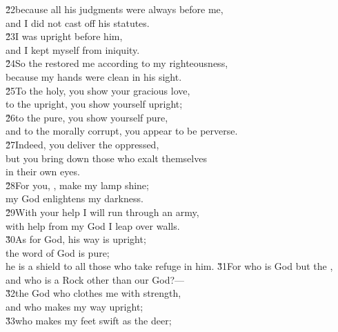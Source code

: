 \begin{poetry}
\poeml \v{22}because all his judgments were always before me, \\
\poemll    and I did not cast off his statutes. \\
\poeml \v{23}I was upright before him, \\
\poemll    and I kept myself from iniquity. \\
\poeml \v{24}So the  restored me according to my righteousness, \\
\poemll    because my hands were clean in his sight. \\
\poeml \v{25}To the holy, you show your gracious love, \\
\poemll    to the upright, you show yourself upright; \\
\poeml \v{26}to the pure, you show yourself pure, \\
\poemll    and to the morally corrupt, you appear to be perverse. \\
\poeml \v{27}Indeed, you deliver the oppressed, \\
\poemll    but you bring down those who exalt themselves \\
\poemlll       in their own eyes. \\
\poeml \v{28}For you, , make my lamp shine; \\
\poemll    my God enlightens my darkness. \\
\poeml \v{29}With your help I will run through an army, \\
\poemll    with help from my God I leap over walls. \\
\poeml \v{30}As for God, his way is upright; \\
\poemll    the word of God is pure; \\
\poemlll       he is a shield to all those who take refuge in him.
\poeml \v{31}For who is God but the , \\
\poemll    and who is a Rock other than our God?--- \\
\poeml \v{32}the God who clothes me with strength, \\
\poemll    and who makes my way upright; \\
\poeml \v{33}who makes my feet swift as the deer; \\

\end{poetry}
